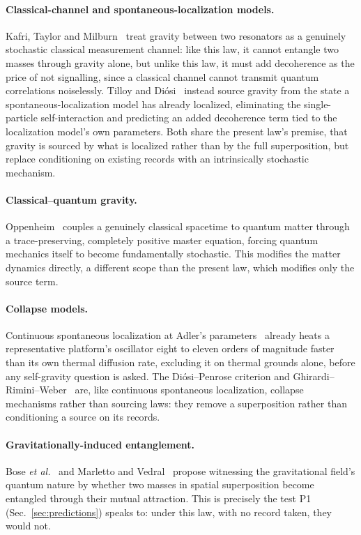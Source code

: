 \documentclass[aps,pra,reprint,amsmath,amssymb,superscriptaddress]{revtex4-2}
\begin{document}
\paragraph{Classical-channel and spontaneous-localization models.}
Kafri, Taylor and Milburn~\cite{Kafri2014} treat gravity between two
resonators as a genuinely stochastic classical measurement channel: like this
law, it cannot entangle two masses through gravity alone, but unlike this
law, it must add decoherence as the price of not signalling, since a
classical channel cannot transmit quantum correlations noiselessly. Tilloy
and Di\'osi~\cite{TilloyDiosi2016} instead source gravity from the state a
spontaneous-localization model has already localized, eliminating the
single-particle self-interaction and predicting an added decoherence term
tied to the localization model's own parameters. Both share the present law's premise, that gravity is sourced by what is
localized rather than by the full superposition, but replace conditioning on
existing records with an intrinsically stochastic mechanism.

\paragraph{Classical--quantum gravity.} Oppenheim~\cite{Oppenheim2023}
couples a genuinely classical spacetime to quantum matter through a
trace-preserving, completely positive master equation, forcing quantum
mechanics itself to become fundamentally stochastic. This modifies the
matter dynamics directly, a different scope than the present law, which
modifies only the source term.

\paragraph{Collapse models.} Continuous spontaneous localization at Adler's
parameters~\cite{BassiRMP2013} already heats a representative platform's
oscillator eight to eleven orders of magnitude faster than its own thermal
diffusion rate, excluding it on thermal grounds alone, before any
self-gravity question is asked. The Di\'osi--Penrose criterion
\cite{Diosi1989,Penrose1996} and Ghirardi--Rimini--Weber~\cite{GRW1986} are,
like continuous spontaneous localization, collapse mechanisms rather than
sourcing laws: they remove a superposition rather than conditioning a source
on its records.

\paragraph{Gravitationally-induced entanglement.} Bose \emph{et
al.}~\cite{BoseEtAl2017} and Marletto and Vedral~\cite{MarlettoVedral2017}
propose witnessing the gravitational field's quantum nature by whether two
masses in spatial superposition become entangled through their mutual
attraction. This is precisely the test P1 (Sec.~\ref{sec:predictions})
speaks to: under this law, with no record taken, they would not.
\end{document}
